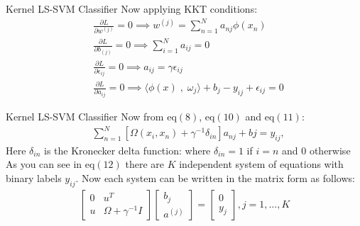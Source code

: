 \documentclass{beamer}
\begin{document}
    \begin{frame}{Kernel LS-SVM Classifier}
        Now applying KKT conditions:
        \begin{align}
            &\frac{{\partial L}}{{\partial w^{(j)}}} = 0 \implies w^{(j)} = \sum_{n=1}^{N}a_{nj}\phi(x_{n}) \\
            &\frac{{\partial L}}{{\partial b_{(j)}}} = 0 \implies \sum_{i=1}^{N}a_{ij} = 0 \\
            &\frac{{\partial L}}{{\partial \epsilon_{ij}}} = 0 \implies
            a_{ij} = \gamma \epsilon_{ij} \\
            &\frac{{\partial L}}{{\partial a_{ij}}} = 0 \implies
            \langle \phi(x) \;,\; \omega_{j}  \rangle + b_{j} - y_{ij} + \epsilon_{ij} = 0
        \end{align}
    \end{frame}
    \begin{frame}{Kernel LS-SVM Classifier}
        Now from eq$(8)$, eq$(10)$ and eq$(11)$:
        \begin{align}
            &\sum_{n=1}^{N} [\Omega(x_{i},x_{n}) + \gamma^{-1}\delta_{in}]a_{nj} + b{j} = y_{ij},
        \end{align}
        Here $\delta_{in}$ is the Kronecker delta function: where $\delta_{in} =1$ if $i=n$ and $0$ otherwise \\
        As you can see in eq$(12)$ there are $K$ independent system of equations with binary labels $y_{ij}$.
        Now each system can be written in the matrix form as follows:
        \begin{align}
            \begin{bmatrix}
                0 & u^{T}                 \\
                u & \Omega + \gamma^{-1}I
            \end{bmatrix}
            \begin{bmatrix}
                b_{j} \\
                a^{(j)}
            \end{bmatrix}
            =
            \begin{bmatrix}
                0 \\
                y_{j}
            \end{bmatrix}
            , j = 1,\ldots,K
        \end{align}
    \end{frame}
\end{document}

